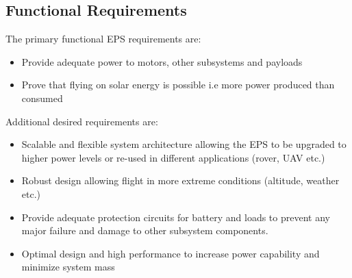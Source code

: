 \subsection{Functional Requirements}
The primary functional \ac{EPS} requirements are:
%
\begin{itemize}
\item Provide adequate power to motors, other subsystems and payloads
\item Prove that flying on solar energy is possible i.e more power produced than consumed
\end{itemize}
%
Additional desired requirements are:
%
\begin{itemize}
\item Scalable and flexible system architecture allowing the \ac{EPS} to be upgraded to higher power levels or re-used in different applications (rover, \ac{UAV} etc.)
\item Robust design allowing flight in more extreme conditions (altitude, weather etc.)
\item Provide adequate protection circuits for battery and loads to prevent any major failure and damage to other subsystem components.
\item Optimal design and high performance to increase power capability and minimize system mass
\end{itemize}
%
